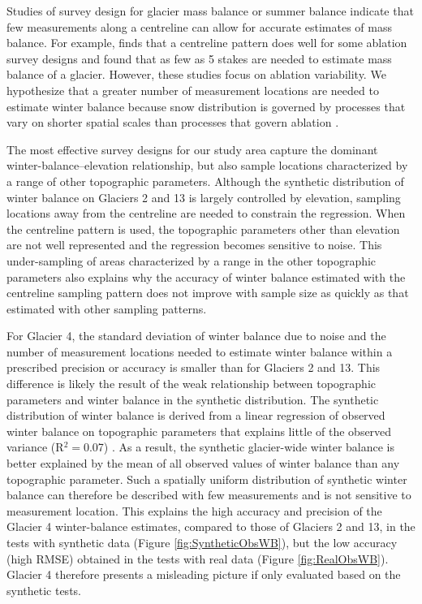 \documentclass[twocolumn,letterpaper]{igs}
\begin{document}
Studies of survey design for glacier mass balance or summer balance indicate that few measurements along a centreline can allow for accurate estimates of mass balance. For example, \citep{Surjanovic2016} finds that a centreline pattern does well for some ablation survey designs and \cite{Fountain1999} found that as few as 5 stakes are needed to estimate mass balance of a glacier. However, these studies focus on ablation variability. We hypothesize that a greater number of measurement locations are needed to estimate winter balance because snow distribution is governed by processes that vary on shorter spatial scales than processes that govern ablation \citep[e.g.][]{Dadic2010,Clark2011}. 

The most effective survey designs for our study area capture the dominant winter-balance--elevation relationship, but also sample locations characterized by a range of other topographic parameters. Although the synthetic distribution of winter balance on Glaciers 2 and 13 is largely controlled by elevation, sampling locations away from the centreline are needed to constrain the regression. When the centreline pattern is used, the topographic parameters other than elevation are not well represented and the regression becomes sensitive to noise. This under-sampling of areas characterized by a range in the other topographic parameters also explains why the accuracy of winter balance estimated with the centreline sampling pattern does not improve with sample size as quickly as that estimated with other sampling patterns. 

For Glacier 4, the standard deviation of winter balance due to noise and the number of measurement locations needed to estimate winter balance within a prescribed precision or accuracy is smaller than for Glaciers 2 and 13. This difference is likely the result of the weak relationship between topographic parameters and winter balance in the synthetic distribution. The synthetic distribution of winter balance is derived from a linear regression of observed winter balance on topographic parameters that explains little of the observed variance (R$^2=$0.07) \citep{Pulwicki2017}. As a result, the synthetic glacier-wide winter balance is better explained by the mean of all observed values of winter balance than any topographic parameter. Such a spatially uniform distribution of synthetic winter balance can therefore be described with few measurements and is not sensitive to measurement location. This explains the high accuracy and precision of the Glacier 4 winter-balance estimates, compared to those of Glaciers 2 and 13, in the tests with synthetic data (Figure \ref{fig:SyntheticObsWB}), but the low accuracy (high RMSE) obtained in the tests with real data (Figure \ref{fig:RealObsWB}). Glacier 4 therefore presents a misleading picture if only evaluated based on the synthetic tests.   
\end{document}
